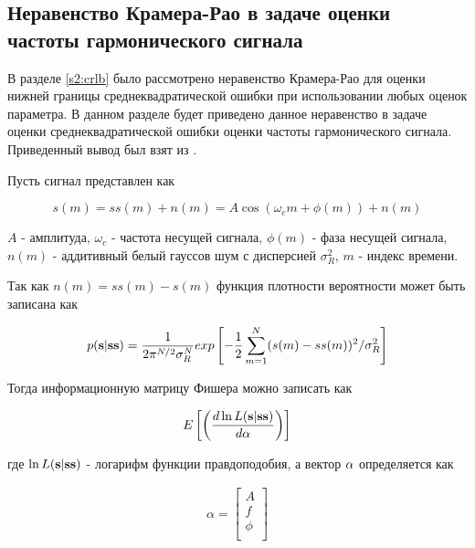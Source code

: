 \subsection{Неравенство Крамера-Рао в задаче оценки частоты гармонического сигнала}

В разделе \ref{s2:crlb} было рассмотрено неравенство Крамера-Рао для оценки нижней границы среднеквадратической ошибки
при использовании любых оценок параметра.
В данном разделе будет приведено данное неравенство в задаче оценки среднеквадратической ошибки оценки частоты
гармонического сигнала. Приведенный вывод был взят из \cite{skon-clrb-report}.

Пусть сигнал представлен как
\begin{center}
\begin{equation}
	\label{eq:crlb3_signal}
	s(m) = ss(m) + n(m) = A\cos(\omega_{c}m + \phi(m)) + n(m)
\end{equation}
\end{center}
${A}$ - амплитуда, ${\omega_c}$ - частота несущей сигнала, ${\phi(m)}$ - фаза несущей сигнала, ${n(m)}$ - аддитивный белый гауссов шум
с дисперсией ${\sigma_R^2}$, ${m}$ - индекс времени.

Так как ${n(m) = ss(m) - s(m)}$ функция плотности вероятности может быть записана как
\begin{center}
\begin{equation}
	\label{eq:crlb3_gauss}
	p({\bf s}|{\bf ss}) = \frac{1}{2\pi^{N/2}\sigma_R^N}
		exp\left[ -\frac{1}{2} \sum \limits_{m=1}^N(s(m)-ss(m))^2 / \sigma_R^2 \right]
\end{equation}
\end{center}

Тогда информационную матрицу Фишера можно записать как
\begin{center}
\begin{equation}
	\label{eq:crlb3_fisher_matrix}
	E \left[ \left( \frac{d \ln L({\bf s}|{\bf ss})}{d {\bf \alpha}} \right)\right]
\end{equation}
\end{center}
где ${\ln L({\bf s}|{\bf ss})}$ - логарифм функции правдоподобия, а вектор ${{\bf \alpha}}$ определяется как
\begin{center}
\begin{eqnarray}
	\label{eq:crlb3_alpha}
		\alpha =
		\left[ \begin{array}{c}
		A \nonumber	\\
		f 		\\
		\phi		\\
		\end{array} \right]
\end{eqnarray}
\end{center}

